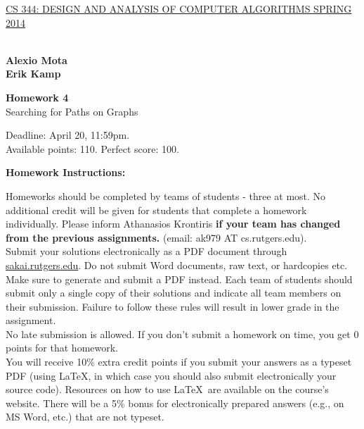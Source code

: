 \documentclass{article}
\begin{document}
\sloppy

\noindent \underline{CS 344: DESIGN AND ANALYSIS OF COMPUTER
  ALGORITHMS \hspace{1.6in} SPRING 2014}

\vspace{0.1in}

\\
{\bf {\large Alexio Mota}}\\
{\bf {\large Erik Kamp}}\\

\vspace{0.1in}

\begin{center}
{\bf {\large Homework 4}}\\
Searching for Paths on Graphs\\
\end{center}

\vspace{0.1in}

\noindent Deadline: April 20, 11:59pm.\\ 
Available points: 110. Perfect score: 100.\\

\begin{center}
{\bf Homework Instructions:}
\end{center}

 Homeworks should be completed by teams of
students - three at most. No additional credit will be given for
students that complete a homework individually. Please inform
Athanasios Krontiris {\bf if your team has changed from the previous
  assignments.} (email: ak979 AT cs.rutgers.edu).\\

 Submit your solutions electronically
as a PDF document through \url{sakai.rutgers.edu}. Do not submit Word
documents, raw text, or hardcopies etc. Make sure to generate and
submit a PDF instead. Each team of students should submit only a
single copy of their solutions and indicate all team members on their
submission.  Failure to follow these rules will result in lower grade
in the assignment.\\

 No late submission is allowed. If
you don't submit a homework on time, you get 0 points for that
homework.\\

 You will receive 10\% extra
credit points if you submit your answers as a typeset PDF (using
\LaTeX, in which case you should also submit electronically your
source code). Resources on how to use \LaTeX\ are available on the
course's website. There will be a 5\% bonus for electronically
prepared answers (e.g., on MS Word, etc.) that are not typeset.\\
\end{document}
